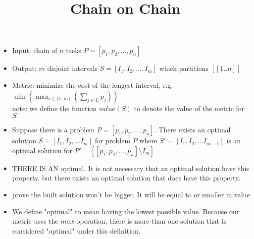 \documentclass{article}
\title{Chain on Chain}
\begin{document}
\maketitle

\begin{itemize}
   \item Input: chain of $n$ tasks $P = [p_1, p_2, ..., p_n]$
   \item Output: $m$ disjoint intervals  $S = [I_1, I_2, ..., I_m]$ which
   			partitions $[[1..n]]$
   \item Metric: minimize the cost of the longest interval, e.g.
				$\min(\max_{i\in\{1..m\}}(\sum_{j \in{I_i}} p_j))$
				\\note: we define the function $value (S)$ to denote the value of 
				the metric for $S$
\end{itemize}

\begin{itemize}
\item Suppose there is a problem $P = [p_1, p_2, ..., p_n]$. There exists an
optimal solution $S = [I_1, I_2, ... I_m]$ for problem $P$ 
where $S' = [I_1, I_2, ... I_{m-1}]$ is an optimal solution for 
$P' = [[p_1, p_2, ..., p_n] \setminus I_m]$
\item THERE IS AN optimal. It is not necessary that an optimal solution have
this property, but there exists an optimal solution that does have this
property.
\item prove the built solution won't be bigger. It will be equal to or
smaller in value
\end{itemize}

\begin{itemize}
	\item We define "optimal" to mean having the lowest possible value. Because
	our metric uses the $max$ operation, there is more than one solution that
	is considered "optimal" under this definition.
\end{itemize}
\end{document}
